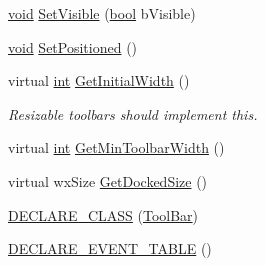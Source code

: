 \begin{DoxyCompactItemize}
\hyperlink{sound_8c_ae35f5844602719cf66324f4de2a658b3}{void} \hyperlink{class_tool_bar_a4fa6372e92e07cb19ae6e485940acd18}{Set\+Visible} (\hyperlink{mac_2config_2i386_2lib-src_2libsoxr_2soxr-config_8h_abb452686968e48b67397da5f97445f5b}{bool} b\+Visible)
\item 
\hyperlink{sound_8c_ae35f5844602719cf66324f4de2a658b3}{void} \hyperlink{class_tool_bar_a9e1b478e3b1925f62398d1cca85f3c99}{Set\+Positioned} ()
\item 
virtual \hyperlink{xmltok_8h_a5a0d4a5641ce434f1d23533f2b2e6653}{int} \hyperlink{class_tool_bar_aabd03e97bd892bd6c2500af93171b774}{Get\+Initial\+Width} ()
\begin{DoxyCompactList}\small\item\em Resizable toolbars should implement this. \end{DoxyCompactList}\item 
virtual \hyperlink{xmltok_8h_a5a0d4a5641ce434f1d23533f2b2e6653}{int} \hyperlink{class_tool_bar_a45d15c34701fcded0cc631fd93c62e20}{Get\+Min\+Toolbar\+Width} ()
\item 
virtual wx\+Size \hyperlink{class_tool_bar_aeb16a93f9b53d51f3ee6b4bb9a2aad37}{Get\+Docked\+Size} ()
\item 
\hyperlink{class_tool_bar_a649e58d75781fa18b86126719526d83b}{D\+E\+C\+L\+A\+R\+E\+\_\+\+C\+L\+A\+SS} (\hyperlink{class_tool_bar}{Tool\+Bar})
\item 
\hyperlink{class_tool_bar_ae5846cd2a0b73fce3bc83415b6f066b0}{D\+E\+C\+L\+A\+R\+E\+\_\+\+E\+V\+E\+N\+T\+\_\+\+T\+A\+B\+LE} ()
\end{DoxyCompactItemize}
